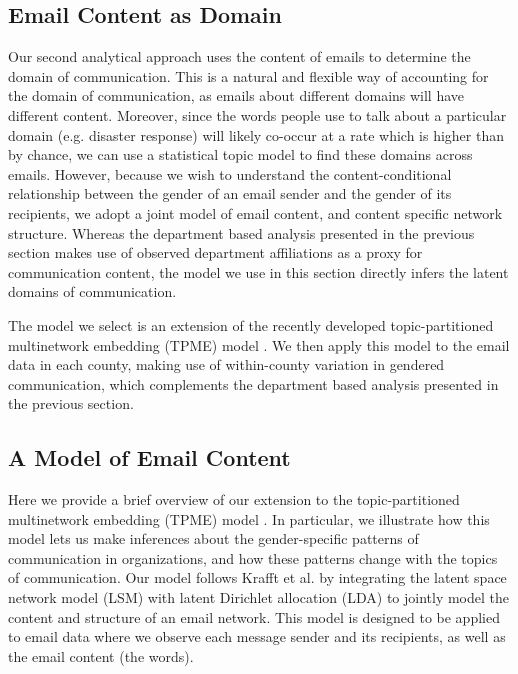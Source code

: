 \documentclass{pnastwo}
\begin{document}
\begin{article}
\section{Email Content as Domain}
Our second analytical approach uses the content of emails to determine the domain of communication. This is a natural and flexible way of accounting for the domain of communication, as emails about different domains will have different content. Moreover, since the words people use to talk about a particular domain (e.g. disaster response) will likely co-occur at a rate which is higher than by chance, we can use a statistical topic model to find these domains across emails. However, because we wish to understand the content-conditional relationship between the gender of an email sender and the gender of its recipients, we adopt a joint model of email content, and content specific network structure. Whereas the department based analysis presented in the previous section makes use of observed department affiliations as a proxy for communication content, the model we use in this section directly infers the latent domains of communication.

The model we select is an extension of the recently developed topic-partitioned multinetwork embedding (TPME) model \citep{Krafft2012}. We then apply this model to the email data in each county, making use of within-county variation in gendered communication, which complements the department based analysis presented in the previous section.


\subsection{A Model of Email Content}
Here we provide a brief overview of our extension to the topic-partitioned
multinetwork embedding (TPME) model \citep{Krafft2012}. In particular, we illustrate how this model lets us make inferences about the gender-specific patterns of communication in organizations, and how these patterns change with the topics of communication. Our model follows Krafft et al. \citep{Krafft2012} by integrating the latent space network model (LSM) \citep{Hoff2002a} with latent Dirichlet allocation (LDA) \cite{Blei2003} to jointly model the content and structure of an email network. This model is designed to be applied to email data where we observe each message sender and its recipients, as well as the email content (the words). 


\end{article}
\end{document}
